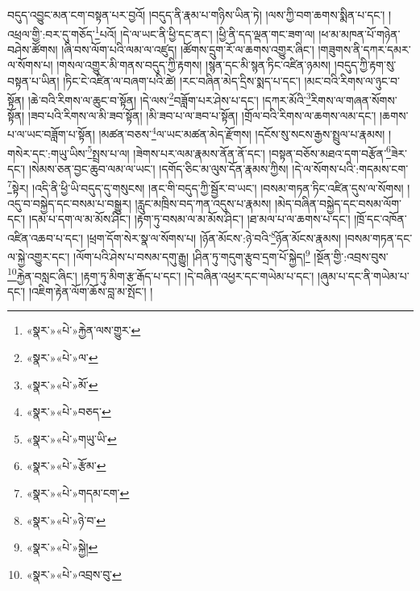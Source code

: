 བདུད་འབྱུང་མན་ངག་བསྟན་པར་བྱའོ། །བདུད་ནི་རྣམ་པ་གཉིས་ཡིན་ཏེ། །ལས་ཀྱི་བག་ཆགས་སྨིན་པ་དང་། །འཕྲལ་གྱི་:བར་དུ་གཅོད་\footnote{«སྣར་»«པེ་»རྐྱེན་ལས་གྱུར་}པའོ། །དེ་ལ་ཡང་ནི་ཕྱི་དང་ནང་། །ཕྱི་ནི་དད་ལྡན་གང་ཟག་ལ། །ཕ་མ་མཁན་པོ་གཉེན་བཤེས་ཚོགས། །ཞི་བས་ལོག་པའི་ལམ་ལ་འཛུད། །ཚོགས་དྲུག་རོ་ལ་ཆགས་འགྱུར་ཞིང་། །གཟུགས་ནི་དཀར་དམར་ལ་སོགས་པ། །གསལ་འགྱུར་མི་གནས་བདུད་ཀྱི་རྟགས། །སྙན་དང་མི་སྙན་ཏིང་འཛིན་ཉམས། །བདུད་ཀྱི་རྟག་སུ་བསྟན་པ་ཡིན། །ཏིང་ངེ་འཛིན་ལ་བཞག་པའི་ཚེ། །རང་བཞིན་མེད་དྲིས་སྨད་པ་དང་། །མང་བའི་རིགས་ལ་ཉུང་བ་སྟོན། །ཆེ་བའི་རིགས་ལ་ཆུང་བ་སྟོན། །དེ་ལས་\footnote{«སྣར་»«པེ་»ལ་}བཟློག་པར་ཤེས་པ་དང་། །དཀར་མོའི་\footnote{«སྣར་»«པེ་»མོ་}རིགས་ལ་གཞན་སོགས་སྟོན། །ཟབ་པའི་རིགས་ལ་མི་ཟབ་སྟོན། །མི་ཟབ་པ་ལ་ཟབ་པ་སྟོན། །གྲོལ་བའི་རིགས་ལ་ཆགས་ལམ་དང་། །ཆགས་པ་ལ་ཡང་བཟློག་པ་སྟོན། །མཚན་བཅས་\footnote{«སྣར་»«པེ་»བཅད་}ལ་ཡང་མཚན་མེད་རྫོགས། །དངོས་སུ་སངས་རྒྱས་སྤྲུལ་པ་རྣམས། །གསེར་དང་:གཡུ་ཡིས་\footnote{«སྣར་»«པེ་»གཡུ་ཡི་}སྤྲས་པ་ལ། །ཟེགས་པར་ལམ་རྣམས་ནོན་ནོ་དང་། །བསྟན་བཅོས་མཐའ་དག་བརྩོན་\footnote{«སྣར་»«པེ་»རྩོམ་}ཟེར་དང་། །སེམས་ཅན་བྱང་ཆུབ་ལམ་ལ་ཡང་། །དགོད་ཅིང་མ་ལུས་དོན་རྣམས་ཀྱིས། །དེ་ལ་སོགས་པའི་:གདམས་ངག་\footnote{«སྣར་»«པེ་»གདམ་ངག་}སྟེར། །འདི་ནི་ཕྱི་ཡི་བདུད་དུ་གསུངས། །ནང་གི་བདུད་ཀྱི་སྦྱོར་བ་ཡང་། །བསམ་གཏན་ཏིང་འཛིན་དུས་ལ་སོགས། །འདུ་བ་བསྐྱེད་དང་བསམ་པ་བསྒྱུར། །རླུང་མཁྲིས་བད་ཀན་འདུས་པ་རྣམས། །མེད་བཞིན་བསྐྱེད་དང་བསམ་ལོག་དང་། །དམ་པ་དག་ལ་མ་མོས་ཤིང་། །རྟག་ཏུ་བསམ་ལ་མ་མོས་ཤིང་། །ཐ་མལ་པ་ལ་ཆགས་པ་དང་། །ཁྲོ་དང་འཁོན་འཛིན་འཆབ་པ་དང་། །ཕྲག་དོག་སེར་སྣ་ལ་སོགས་པ། །ཉོན་མོངས་:ཉེ་བའི་\footnote{«སྣར་»«པེ་»ཉེ་བ་}ཉོན་མོངས་རྣམས། །བསམ་གཏན་དང་ལ་སྐྱེ་འགྱུར་དང་། །ལོག་པའི་ཤེས་པ་བསམ་དགུ་རྒྱུ། །ཤིན་ཏུ་གདུག་རྩུབ་དྲག་པོ་སྐྱེད།\footnote{«སྣར་»«པེ་»སྐྱེ།} །སྔོན་གྱི་:འབྲས་བུས་\footnote{«སྣར་»«པེ་»འབྲས་བུ་}རྐྱེན་བསླང་ཞིང་། །རྟག་ཏུ་མིག་རྩ་རྒོད་པ་དང་། །དེ་བཞིན་འཕྱར་དང་གཡེམ་པ་དང་། །ཞུམ་པ་དང་ནི་གཡེམ་པ་དང་། །འཇིག་རྟེན་ལོག་ཆོས་བླ་མ་སྤོང་། །
